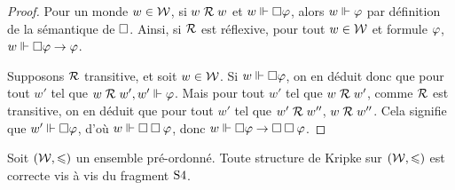 \begin{proof}
  Pour un monde $w \in \mathcal{W}$, si $w\mathrel{\mathcal{R}} w$ et $w\Vdash\mathbin{\square}\varphi$, alors
  $w\Vdash\varphi$ par définition de la sémantique de $\mathbin{\square}$. Ainsi, si
  $\mathrel{\mathcal{R}}$ est réflexive, pour tout $w \in \mathcal{W}$ et formule $\varphi$,
  $w\Vdash\mathbin{\square}\varphi\to\varphi$.

  Supposons $\mathrel{\mathcal{R}}$ transitive, et soit $w \in \mathcal{W}$. Si
  $w \Vdash \mathbin{\square}\varphi$, on en déduit donc que pour tout $w'$ tel que
  $w\mathrel{\mathcal{R}} w', w'\Vdash\varphi$. Mais pour tout $w'$ tel que $w\mathrel{\mathcal{R}} w'$,
  comme $\mathrel{\mathcal{R}}$ est transitive, on en déduit que pour tout $w'$ tel que
  $w'\mathrel{\mathcal{R}} w''$, $w\mathrel{\mathcal{R}} w''$. Cela signifie que $w'\Vdash\mathbin{\square}\varphi$,
  d'où $w\Vdash\mathbin{\square}\mathbin{\square}\varphi$, donc
  $w\Vdash\mathbin{\square}\varphi\to\mathbin{\square}\mathbin{\square}\varphi$.
\end{proof}

\begin{corollary}
  Soit $(\mathcal{W},\leqslant)$ un ensemble pré-ordonné. Toute structure de Kripke sur
  $(\mathcal{W},\leqslant)$ est correcte vis à vis du fragment $\mathrm{S}4$.
\end{corollary}

